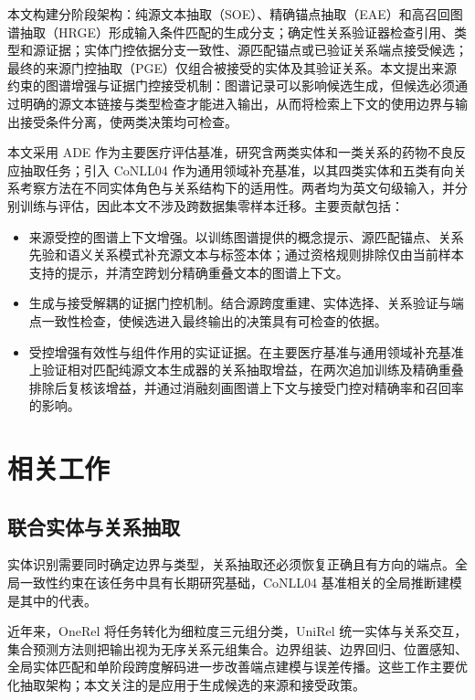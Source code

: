 \documentclass[UTF8,a4paper,twocolumn,10pt]{ctexart}
\begin{document}
本文构建分阶段架构：纯源文本抽取（SOE）、精确锚点抽取（EAE）和高召回图谱抽取（HRGE）形成输入条件匹配的生成分支；确定性关系验证器检查引用、类型和源证据；实体门控依据分支一致性、源匹配锚点或已验证关系端点接受候选；最终的来源门控抽取（PGE）仅组合被接受的实体及其验证关系。本文提出来源约束的图谱增强与证据门控接受机制：图谱记录可以影响候选生成，但候选必须通过明确的源文本链接与类型检查才能进入输出，从而将检索上下文的使用边界与输出接受条件分离，使两类决策均可检查。

本文采用 ADE\cite{gurulingappa2012ade} 作为主要医疗评估基准，研究含两类实体和一类关系的药物不良反应抽取任务；引入 CoNLL04\cite{roth2004conll} 作为通用领域补充基准，以其四类实体和五类有向关系考察方法在不同实体角色与关系结构下的适用性。两者均为英文句级输入，并分别训练与评估，因此本文不涉及跨数据集零样本迁移。主要贡献包括：
\begin{itemize}
\item 来源受控的图谱上下文增强。以训练图谱提供的概念提示、源匹配锚点、关系先验和语义关系模式补充源文本与标签本体；通过资格规则排除仅由当前样本支持的提示，并清空跨划分精确重叠文本的图谱上下文。
\item 生成与接受解耦的证据门控机制。结合源跨度重建、实体选择、关系验证与端点一致性检查，使候选进入最终输出的决策具有可检查的依据。
\item 受控增强有效性与组件作用的实证证据。在主要医疗基准与通用领域补充基准上验证相对匹配纯源文本生成器的关系抽取增益，在两次追加训练及精确重叠排除后复核该增益，并通过消融刻画图谱上下文与接受门控对精确率和召回率的影响。
\end{itemize}

\section{相关工作}
\subsection{联合实体与关系抽取}
实体识别需要同时确定边界与类型，关系抽取还必须恢复正确且有方向的端点\cite{li2022ner}。全局一致性约束在该任务中具有长期研究基础，CoNLL04 基准相关的全局推断建模是其中的代表\cite{roth2004conll}。

近年来，OneRel 将任务转化为细粒度三元组分类，UniRel 统一实体与关系交互，集合预测方法则把输出视为无序关系元组集合\cite{shang2022onerel,tang2022unirel,sui2024setprediction}。边界组装、边界回归、位置感知、全局实体匹配和单阶段跨度解码进一步改善端点建模与误差传播\cite{tang2022boundaryassembling,tang2023boundaryregression,chen2022positionaware,zhang2022positionaware,gao2023ergm,han2023spanbased}。这些工作主要优化抽取架构；本文关注的是应用于生成候选的来源和接受政策。
\end{document}
